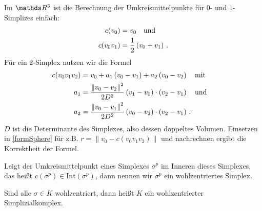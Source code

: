     \begin{bemerkung}
      Im \( \R^{3} \) ist die Berechnung der Umkreismittelpunkte für \( 0 \)- und \( 1 \)-Simplizes einfach:
      \begin{align}
        c(v_{0}) &= v_{0} \quad\text{und}\quad\\
        c(v_{0}v_{1}) &= \frac{1}{2} \left(v_{0} + v_{1} \right) \,\text{.}
      \end{align}
      Für ein \( 2 \)-Simplex nutzen wir die Formel
      \begin{align}
        \begin{aligned}
          c(v_{0}v_{1}v_{2}) &= v_{0} + a_{1}\left( v_{0} - v_{1} \right) + a_{2} \left( v_{0} - v_{2} \right) \quad\text{mit}\quad \\
          a_{1} &= \frac{\left\| v_{0} - v_{2} \right\|^{2}}{2 D^{2}} \left(v_{1} - v_{0} \right) \cdot \left(v_{2} - v_{1} \right) \quad\text{und}\quad \\ 
          a_{2} &= \frac{\left\| v_{0} - v_{1} \right\|^{2}}{2 D^{2}} \left(v_{0} - v_{2} \right) \cdot \left(v_{2} - v_{1} \right) \,\text{.}
        \end{aligned}
      \end{align}
      \( D \) ist die Determinante des Simplexes, also dessen doppeltes Volumen. 
      Einsetzen in \eqref{formSphere} für z.B. \( r = \left\| v_{0} - c(v_{0}v_{1}v_{2}) \right\| \) und nachrechnen ergibt die Korrektheit der Formel.
    \end{bemerkung}

    \begin{definition}
      Leigt der Umkreismittelpunkt eines Simplexes \( \sigma^{p} \) im Inneren dieses Simplexes, das heißt \( c(\sigma^{p}) \in \text{Int}(\sigma^{p}) \),
      dann nennen wir \( \sigma^{p} \) ein wohlzentriertes Simplex.

      Sind alle \( \sigma \in K \) wohlzentriert, dann heißt \( K \) ein wohlzentrierter Simplizialkomplex.
    \end{definition}

